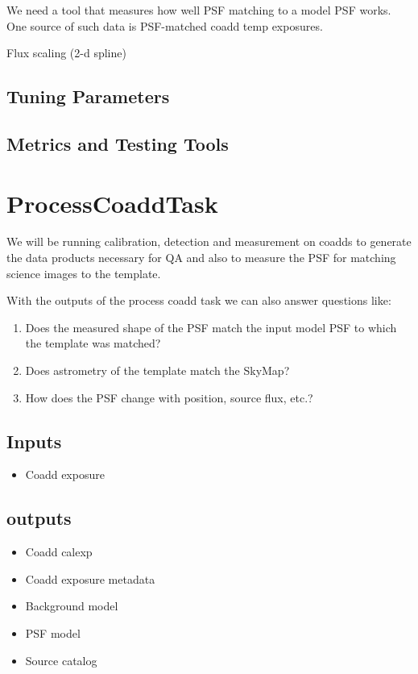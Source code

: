 \documentclass[12pt]{article}
\begin{document}
We need a tool that measures how well PSF matching to a model PSF
works. One source of such data is PSF-matched coadd temp exposures.

Flux scaling (2-d spline)

\subsection{Tuning Parameters}

\subsection{Metrics and Testing Tools}


\clearpage 
\section{ProcessCoaddTask} 
We will be running calibration, detection and measurement on coadds to 
generate the data products necessary for QA and also to measure the PSF
for matching science images to the template.

With the outputs of the process coadd task we can also answer questions like:
\begin{enumerate}
\item Does the measured shape of the PSF match the input model PSF to which the template was matched?
\item Does astrometry of the template match the SkyMap?
\item How does the PSF change with position, source flux, etc.?
\end{enumerate}

\subsection{Inputs}
\begin{itemize}
\item Coadd exposure
\end{itemize}

\subsection{outputs}
\begin{itemize}
\item Coadd calexp
\item Coadd exposure metadata
\item Background model
\item PSF model
\item Source catalog
\end{itemize}
\end{document}
